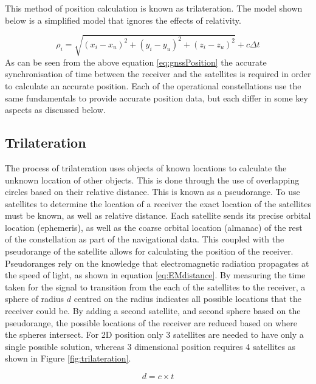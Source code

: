 This method of position calculation is known as trilateration. The model shown below is a simplified model that ignores the effects of relativity. 

\begin{equation} \label{eq:gnssPosition} 
    \rho_i = \sqrt{(x_i - x_u)^2 + (y_i - y_u)^2 + (z_i - z_u)^2} + c \Delta t
\end{equation}
As can be seen from the above equation \ref{eq:gnssPosition} the accurate synchronisation of time between the receiver and the satellites is required in order to
calculate an accurate position. 
Each of the operational constellations use the same fundamentals to provide accurate position data, but each differ in some key aspects as discussed below.

\subsection{Trilateration} \label{subsec:Trilateration}
The process of trilateration uses objects of known locations to calculate the unknown location of other objects. This is done through the use of overlapping circles based
on their relative distance. This is known as a pseudorange. To use satellites to determine the location of a receiver the exact location of the satellites must be
known, as well as relative distance. Each satellite sends its precise orbital location (ephemeris), as well as the coarse orbital location (almanac) of the rest of the
constellation as part of the navigational data. This coupled with the pseudorange of the satellite allows for calculating the position of the receiver. Pseudoranges rely
on the knowledge that electromagnetic radiation propagates at the speed of light, as shown in equation \ref{eq:EMdistance}. By measuring the time taken for the signal to
transition from the each of the satellites to the receiver, a sphere of radius $d$ centred on the radius indicates all possible locations that the receiver could be. By
adding a second satellite, and second sphere based on the pseudorange, the possible locations of the receiver are reduced based on where the spheres intersect. For 2D
position only 3 satellites are needed to have only a single possible solution, whereas 3 dimensional position requires 4 satellites as shown in Figure
\ref{fig:trilateration}.

\begin{equation} \label{eq:EMdistance}
    d = c \times t
\end{equation}

